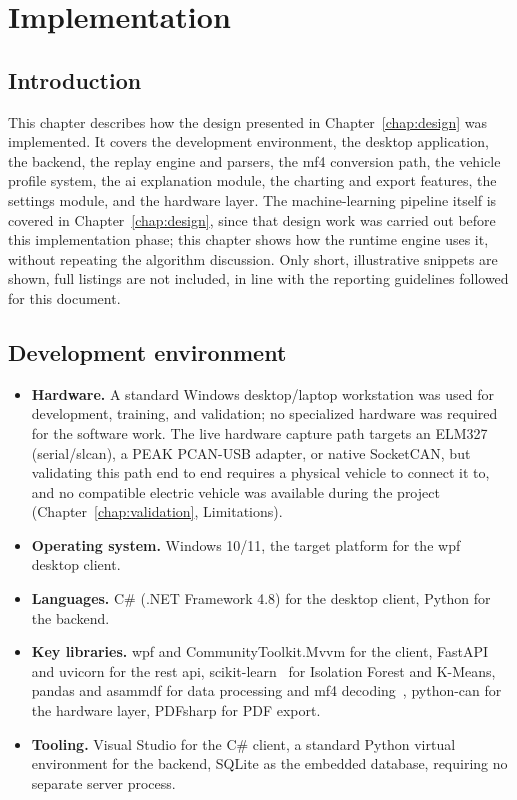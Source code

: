 \chapter{Implementation}
\label{chap:impl}

\section{Introduction}

This chapter describes how the design presented in Chapter~\ref{chap:design} was implemented. It covers the development environment, the desktop application, the backend, the replay engine and parsers, the \gls{mf4} conversion path, the vehicle profile system, the \gls{ai} explanation module, the charting and export features, the settings module, and the hardware layer. The machine-learning pipeline itself is covered in Chapter~\ref{chap:design}, since that design work was carried out before this implementation phase; this chapter shows how the runtime engine uses it, without repeating the algorithm discussion. Only short, illustrative snippets are shown, full listings are not included, in line with the reporting guidelines followed for this document.

\section{Development environment}

\begin{itemize}
    \item \textbf{Hardware.} A standard Windows desktop/laptop workstation was used for development, training, and validation; no specialized hardware was required for the software work. The live hardware capture path targets an ELM327 (serial/slcan), a PEAK PCAN-USB adapter, or native SocketCAN, but validating this path end to end requires a physical vehicle to connect it to, and no compatible electric vehicle was available during the project (Chapter~\ref{chap:validation}, Limitations).
    \item \textbf{Operating system.} Windows 10/11, the target platform for the \gls{wpf} desktop client.
    \item \textbf{Languages.} C\# (.NET Framework 4.8) for the desktop client, Python for the backend.
    \item \textbf{Key libraries.} \gls{wpf} and CommunityToolkit.Mvvm for the client, FastAPI and uvicorn for the \gls{rest} \gls{api}, scikit-learn~\cite{pedregosa2011scikit} for Isolation Forest and K-Means, pandas and asammdf for data processing and \gls{mf4} decoding~\cite{asam_mdf}, python-can for the hardware layer, PDFsharp for PDF export.
    \item \textbf{Tooling.} Visual Studio for the C\# client, a standard Python virtual environment for the backend, SQLite as the embedded database, requiring no separate server process.
\end{itemize}


